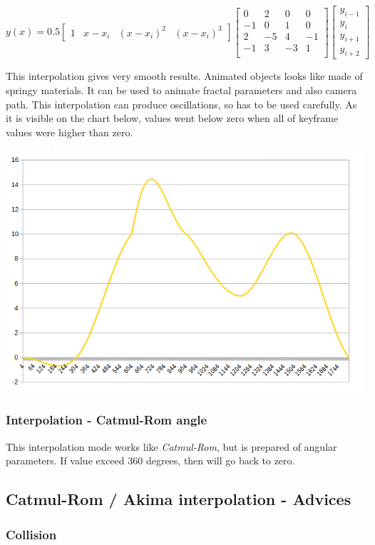 \[ y(x) = 0.5 \begin{bmatrix} 1 & x-x_i & (x-x_i)^2 & (x-x_i)^3\end{bmatrix}
\begin{bmatrix} 0 & 2 & 0 & 0 \\ -1 & 0 & 1 & 0 \\ 2 & -5 & 4 & -1 \\ -1 & 3 &
-3 & 1 \\ \end{bmatrix} \begin{bmatrix} y_{i-1} \\ y_i \\ y_{i+1} \\ y_{i+2}
\end{bmatrix} \]

This interpolation gives very smooth results. Animated objects looks like made
of springy materials. It can be used to animate fractal parameters and also
camera path. This interpolation can produce oscillations, so has to be used
carefully. As it is visible on the chart below, values went below zero when all
of keyframe values were higher than zero.

\includegraphics[width=0.5\linewidth]{img/manual/media/interpolation_catmulrom.png}

\subsubsection{Interpolation - Catmul-Rom
	angle}\label{interpolation-catmul-rom-angle}

This interpolation mode works like \emph{Catmul-Rom}, but is prepared of angular
parameters. If value exceed 360 degrees, then will go back to zero.

\subsection{Catmul-Rom / Akima interpolation -
	Advices}\label{catmul-rom-akima-interpolation---advices}

\subsubsection{Collision}\label{collision}

